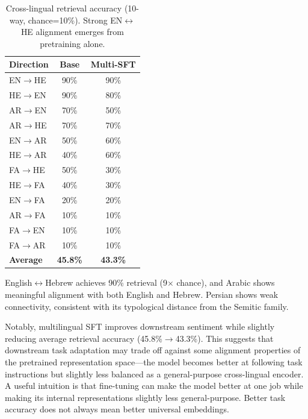 \documentclass[10pt,twocolumn]{article}
\begin{document}
\begin{table}[H]
\centering\small
\begin{tabular}{lcc}
\toprule
\textbf{Direction} & \textbf{Base} & \textbf{Multi-SFT} \\
\midrule
EN$\rightarrow$HE & 90\% & 90\% \\
HE$\rightarrow$EN & 90\% & 80\% \\
AR$\rightarrow$EN & 70\% & 50\% \\
AR$\rightarrow$HE & 70\% & 70\% \\
EN$\rightarrow$AR & 50\% & 60\% \\
HE$\rightarrow$AR & 40\% & 60\% \\
FA$\rightarrow$HE & 50\% & 30\% \\
HE$\rightarrow$FA & 40\% & 30\% \\
EN$\rightarrow$FA & 20\% & 20\% \\
AR$\rightarrow$FA & 10\% & 10\% \\
FA$\rightarrow$EN & 10\% & 10\% \\
FA$\rightarrow$AR & 10\% & 10\% \\
\midrule
\textbf{Average} & \textbf{45.8\%} & \textbf{43.3\%} \\
\bottomrule
\end{tabular}
\caption{Cross-lingual retrieval accuracy (10-way, chance=10\%). Strong EN$\leftrightarrow$HE alignment emerges from pretraining alone.}
\label{tab:embeddings}
\end{table}

English$\leftrightarrow$Hebrew achieves 90\% retrieval (9$\times$ chance), and Arabic shows meaningful alignment with both English and Hebrew. Persian shows weak connectivity, consistent with its typological distance from the Semitic family.

Notably, multilingual SFT improves downstream sentiment while slightly reducing average retrieval accuracy (45.8\%$\rightarrow$43.3\%). This suggests that downstream task adaptation may trade off against some alignment properties of the pretrained representation space---the model becomes better at following task instructions but slightly less balanced as a general-purpose cross-lingual encoder. A useful intuition is that fine-tuning can make the model better at one job while making its internal representations slightly less general-purpose. Better task accuracy does not always mean better universal embeddings.
\end{document}
